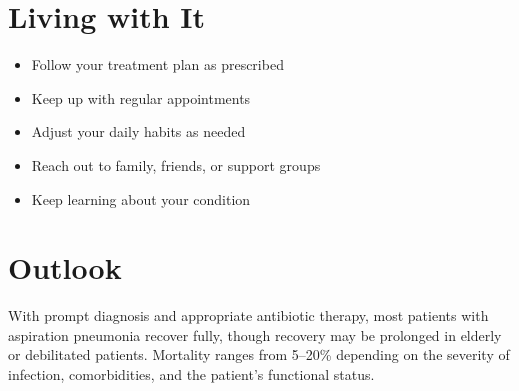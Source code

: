 \section{Living with It}

\begin{itemize}[noitemsep]
  \item Follow your treatment plan as prescribed
  \item Keep up with regular appointments
  \item Adjust your daily habits as needed
  \item Reach out to family, friends, or support groups
  \item Keep learning about your condition
\end{itemize}

\section{Outlook}
With prompt diagnosis and appropriate antibiotic therapy, most patients with aspiration pneumonia recover fully, though recovery may be prolonged in elderly or debilitated patients. Mortality ranges from 5--20\% depending on the severity of infection, comorbidities, and the patient's functional status.
